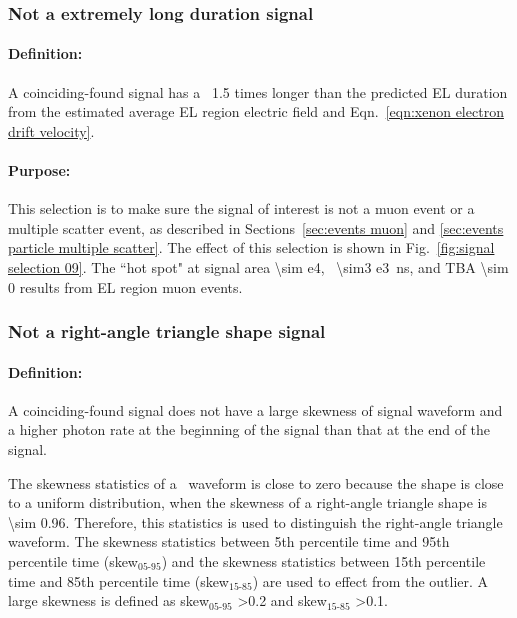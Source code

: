 \subsubsection{Not a extremely long duration signal}
\paragraph{Definition:}
A coinciding-found signal has a \pud\ 1.5 times longer than the predicted EL duration from the estimated average EL region electric field and Eqn.~\ref{eqn:xenon electron drift velocity}. 
\paragraph{Purpose:}
This selection is to make sure the signal of interest is not a muon event or a multiple scatter event, as described in Sections~\ref{sec:events muon} and \ref{sec:events particle multiple scatter}. The effect of this selection is shown in Fig.~\ref{fig:signal selection 09}. The ``hot spot" at signal area \SI{\sim e4}{\phe}, \rpd\ \SI{\sim3 e3}{\ns}, and TBA \num{\sim 0} results from EL region muon events. 

\subsubsection{Not a right-angle triangle shape signal}
\paragraph{Definition:}
A coinciding-found signal does not have a large skewness of signal waveform and a higher photon rate at the beginning of the signal than that at the end of the signal. 

The skewness statistics of a \ees\ waveform is close to zero because the shape is close to a uniform distribution, when the skewness of a right-angle triangle shape is \num{\sim 0.96}. Therefore, this statistics is used to distinguish the right-angle triangle waveform. The skewness statistics between 5th percentile time and 95th percentile time (skew$_\text{05-95}$) and the skewness statistics between 15th percentile time and 85th percentile time (skew$_\text{15-85}$) are used to effect from the outlier. A large skewness is defined as skew$_\text{05-95}$ \num{>0.2} and skew$_\text{15-85}$ \num{>0.1}.

